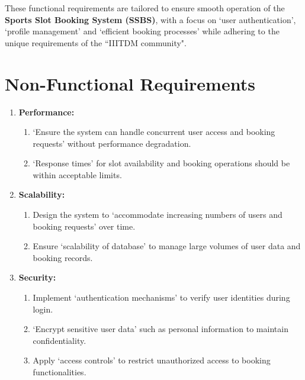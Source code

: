 \documentclass[12pt]{article}
\begin{document}
\vspace{0.2cm}
\hspace{0.4cm}These functional requirements are tailored to ensure smooth operation of the \textbf{Sports Slot Booking System (SSBS)}, with a focus on `user authentication', `profile management' and `efficient booking processes' while adhering to the unique requirements of the ``IIITDM community".

\section*{Non-Functional Requirements}

\begin{enumerate}[label=\arabic*.]
    \item \textbf{Performance:}
    \begin{enumerate}[label=\alph*)]
        \item `Ensure the system can handle concurrent user access and booking requests' without performance degradation.
        \item `Response times' for slot availability and booking operations should be within acceptable limits.
    \end{enumerate}

    \vspace{0.4cm}

    \item \textbf{Scalability:}
    \begin{enumerate}[label=\alph*)]
        \item Design the system to `accommodate increasing numbers of users and booking requests' over time.
        \item Ensure `scalability of database' to manage large volumes of user data and booking records.
    \end{enumerate}

    \vspace{0.4cm}

    \item \textbf{Security:}
    \begin{enumerate}[label=\alph*)]
        \item Implement `authentication mechanisms' to verify user identities during login.
        \item `Encrypt sensitive user data' such as personal information to maintain confidentiality.
        \item Apply `access controls' to restrict unauthorized access to booking functionalities.
    \end{enumerate}


\end{enumerate}
\end{document}
